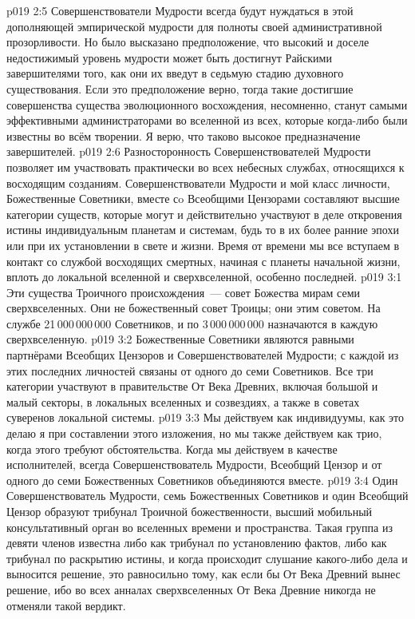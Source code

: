\vs p019 2:5 Совершенствователи Мудрости всегда будут нуждаться в этой дополняющей эмпирической мудрости для полноты своей административной прозорливости. Но было высказано предположение, что высокий и доселе недостижимый уровень мудрости может быть достигнут Райскими завершителями  того, как они их введут в седьмую стадию духовного существования. Если это предположение верно, тогда такие достигшие совершенства существа эволюционного восхождения, несомненно, станут самыми эффективными администраторами во вселенной из всех, которые когда\hyp{}либо были известны во всём творении. Я верю, что таково высокое предназначение завершителей.
\vs p019 2:6 \pc Разносторонность Совершенствователей Мудрости позволяет им участвовать практически во всех небесных службах, относящихся к восходящим созданиям. Совершенствователи Мудрости и мой класс личности, Божественные Советники, вместе сo Всеобщими Цензорами составляют высшие категории существ, которые могут и действительно участвуют в деле откровения истины индивидуальным планетам и системам, будь то в их более ранние эпохи или при их установлении в свете и жизни. Время от времени мы все вступаем в контакт со службой восходящих смертных, начиная с планеты начальной жизни, вплоть до локальной вселенной и сверхвселенной, особенно последней.
\vs p019 3:1 Эти существа Троичного происхождения~--- совет Божества мирам семи сверхвселенных. Они не  божественный совет Троицы; они  этим советом. На службе 21\,000\,000\,000 Советников, и по 3\,000\,000\,000 назначаются в каждую сверхвселенную.
\vs p019 3:2 Божественные Советники являются равными партнёрами Всеобщих Цензоров и Совершенствователей Мудрости; с каждой из этих последних личностей связаны от одного до семи Советников. Все три категории участвуют в правительстве От Века Древних, включая большой и малый секторы, в локальных вселенных и созвездиях, а также в советах суверенов локальной системы.
\vs p019 3:3 Мы действуем как индивидуумы, как это делаю я при составлении этого изложения, но мы также действуем как трио, когда этого требуют обстоятельства. Когда мы действуем в качестве исполнителей, всегда Совершенствователь Мудрости, Всеобщий Цензор и от одного до семи Божественных Советников объединяются вместе.
\vs p019 3:4 \pc Один Совершенствователь Мудрости, семь Божественных Советников и один Всеобщий Цензор образуют трибунал Троичной божественности, высший мобильный консультативный орган во вселенных времени и пространства. Такая группа из девяти членов известна либо как трибунал по установлению фактов, либо как трибунал по раскрытию истины, и когда происходит слушание какого\hyp{}либо дела и выносится решение, это равносильно тому, как если бы От Века Древний вынес решение, ибо во всех анналах сверхвселенных От Века Древние никогда не отменяли такой вердикт.
